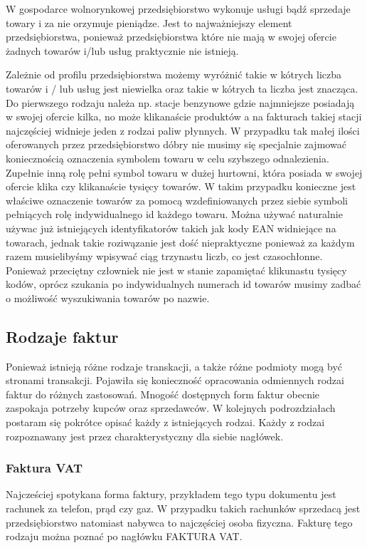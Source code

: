 W gospodarce wolnorynkowej przedsiębiorstwo wykonuje usługi bądź sprzedaje
towary i za nie orzymuje pieniądze. Jest to najważniejszy element
przedsiębiorstwa, ponieważ przedsiębiorstwa które nie mają w swojej ofercie
żadnych towarów i/lub usług praktycznie nie istnieją.

Zależnie od profilu przedsiębiorstwa możemy wyróżnić takie w kótrych liczba
towarów i / lub usług jest niewielka oraz takie w kótrych ta liczba jest
znacząca. Do pierwszego rodzaju należa np. stacje benzynowe gdzie najmniejsze
posiadają w swojej ofercie kilka, no może klikanaście produktów a na fakturach
takiej stacji najczęściej widnieje jeden z rodzai paliw płynnych. W przypadku
tak małej ilości oferowanych przez przedsiębiorstwo dóbry nie musimy się
specjalnie zajmować koniecznością oznaczenia symbolem towaru w celu szybszego
odnalezienia. Zupełnie inną rolę pełni symbol towaru w dużej hurtowni, która
posiada w swojej ofercie klika czy klikanaście tysięcy towarów. W takim
przypadku konieczne jest właściwe oznaczenie towarów za pomocą wzdefiniowanych
przez siebie symboli pełniących rolę indywidualnego id każdego towaru. Można
używać naturalnie używac już istniejących identyfikatorów takich jak kody EAN
widniejące na towarach, jednak takie roziwązanie jest dość niepraktyczne
ponieważ za każdym razem musielibyśmy wpisywać ciąg trzynastu liczb, co jest
czasochłonne. Ponieważ przeciętny człowniek nie jest w stanie zapamiętać
klikunastu tysięcy kodów, oprócz szukania po indywidualnych numerach id towarów
musimy zadbać o możliwość wyszukiwania towarów po nazwie.
\subsection{Rodzaje faktur}
\label{rodzajeFaktur}
Ponieważ istnieją różne rodzaje transkacji, a także różne podmioty mogą być
stronami transakcji. Pojawiła się konieczność opracowania odmiennych rodzai
faktur do różnych zastosowań. Mnogość dostępnych form faktur obecnie zaspokaja
potrzeby kupców oraz sprzedawców. W kolejnych podrozdziałach postaram się
pokrótce opisać każdy z istniejących rodzai. Każdy z rodzai rozpoznawany jest
przez charakterystyczny dla siebie nagłówek.
\subsubsection{Faktura VAT}
Najcześciej spotykana forma faktury, przykładem tego typu dokumentu jest
rachunek za telefon, prąd czy gaz.
W przypadku takich rachunków sprzedacą jest przedsiębiorstwo natomiast nabywca to najczęściej osoba fizyczna.
Fakturę tego rodzaju można poznać po nagłówku FAKTURA VAT.

